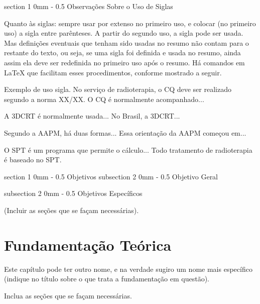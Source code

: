 \documentclass[a4paper, 12pt]{ppgeb}
\makeatletter
\renewcommand{\section}{\@startsection
{section}
{1}
{0mm}
{-\baselineskip}
{0.5\baselineskip}
{\large\bfseries\scshape}}
\renewcommand{\subsection}{\@startsection
{subsection}
{2}
{0mm}
{-\baselineskip}
{0.5\baselineskip}
{\bf\sffamily}}
\makeatother
\begin{document}
\section{Observações Sobre o Uso de Siglas}

Quanto às siglas: sempre usar por extenso no primeiro uso, e colocar (no primeiro uso) a sigla entre parênteses. A partir do segundo uso, a sigla pode ser usada. Mas definições eventuais que tenham sido usadas no resumo não contam para o restante do texto, ou seja, se uma sigla foi definida e usada no resumo, ainda assim ela deve ser redefinida no primeiro uso após o resumo. Há comandos em LaTeX que facilitam esses procedimentos, conforme mostrado a seguir.

Exemplo de uso sigla. No serviço de radioterapia, o \ac{CQ} deve ser realizado segundo a norma XX/XX. O \ac{CQ} é normalmente acompanhado... 

A \ac{3DCRT} é normalmente usada... No Brasil, a \ac{3DCRT}...

Segundo a \ac{AAPM}, há duas formas... Essa orientação da \ac{AAPM} começou em...

O \ac{SPT} é um programa que permite o cálculo... Todo tratamento de radioterapia é baseado no \ac{SPT}.

\section{Objetivos}
\subsection{Objetivo Geral}

\subsection{Objetivos Específicos}

(Incluir as seções que se façam necessárias).

\chapter{Fundamentação Teórica}\label{chap:FT}



Este capítulo pode ter outro nome, e na verdade sugiro um nome mais específico (indique no título sobre o que trata a fundamentação em questão).

Inclua as seções que se façam necessárias.
\end{document}
